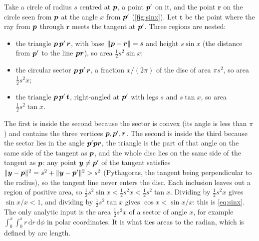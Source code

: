 Take a circle of radius $s$ centred at $\bm{p}$, a point $\bm{p}'$ on it, and the
point $\bm r$ on the circle seen from $\bm{p}$ at the angle $x$ from $\bm{p}'$
(\cref{fig:sinx}). Let $\bm t$ be the point where the ray from $\bm{p}$ through
$\bm r$ meets the tangent at $\bm{p}'$. Three regions are nested:
\begin{itemize}
  \item the triangle $\bm{p}\,\bm{p}'\,\bm r$, with base $\|\bm{p}-\bm r\|=s$ and height
    $s\sin x$ (the distance from $\bm{p}'$ to the line $\bm{p}\bm r$), so area
    $\tfrac12 s^2\sin x$;
  \item the circular sector $\bm{p}\,\bm{p}'\,\bm r$, a fraction $x/(2\pi)$ of the
    disc of area $\pi s^2$, so area $\tfrac12 s^2 x$;
  \item the triangle $\bm{p}\,\bm{p}'\,\bm t$, right-angled at $\bm{p}'$ with legs $s$
    and $s\tan x$, so area $\tfrac12 s^2\tan x$.
\end{itemize}
The first is inside the second because the sector is convex (its angle is
less than $\pi$) and contains the three vertices $\bm{p},\bm{p}',\bm r$. The
second is inside the third because the sector lies in the angle $\bm{p}'\bm{p}\bm
r$, the triangle is the part of that angle on the same side of the
tangent as $\bm{p}$, and the whole disc lies on the same side of the
tangent as $\bm{p}$: any point $\bm y\ne\bm{p}'$ of the tangent satisfies
$\|\bm y-\bm{p}\|^2=s^2+\|\bm y-\bm{p}'\|^2>s^2$ (Pythagoras, the tangent being
perpendicular to the radius), so the tangent line never enters the disc.
Each inclusion leaves out a region of positive area, so
$\tfrac12 s^2\sin x<\tfrac12 s^2 x<\tfrac12 s^2\tan x$. Dividing by
$\tfrac12 s^2 x$ gives $\sin x/x<1$, and dividing by $\tfrac12 s^2\tan x$
gives $\cos x<\sin x/x$: this is \eqref{eq:sinx}. The only analytic input is the area $\tfrac12s^2x$ of a sector of angle
$x$, for example
$\int_0^x\!\int_0^s r\,\mathrm dr\,\mathrm d\phi$ in polar coordinates.
It is what ties areas to the radian, which is defined by arc length.
